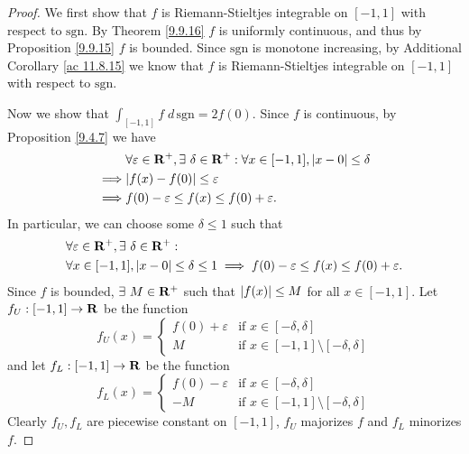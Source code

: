 \begin{proof}
    We first show that \(f\) is Riemann-Stieltjes integrable on \([-1, 1]\) with respect to \(\text{sgn}\).
    By Theorem \ref{9.9.16} \(f\) is uniformly continuous, and thus by Proposition \ref{9.9.15} \(f\) is bounded.
    Since \(\text{sgn}\) is monotone increasing, by Additional Corollary \ref{ac 11.8.15} we know that \(f\) is Riemann-Stieltjes integrable on \([-1, 1]\) with respect to \(\text{sgn}\).

    Now we show that \(\int_{[-1, 1]} f \; d \, \text{sgn} = 2f(0)\).
    Since \(f\) is continuous, by Proposition \ref{9.4.7} we have
    \begin{align*}
                 & \forall \varepsilon \in \R^+, \exists\ \delta \in \R^+ : \forall x \in [-1, 1], \abs{x - 0} \leq \delta \\
        \implies & \abs{f(x) - f(0)} \leq \varepsilon                                                                      \\
        \implies & f(0) - \varepsilon \leq f(x) \leq f(0) + \varepsilon.
    \end{align*}
    In particular, we can choose some \(\delta \leq 1\) such that
    \begin{align*}
         & \forall \varepsilon \in \mathbf{R}^+, \exists\ \delta \in \mathbf{R}^+ :                                                             \\
         & \forall x \in [-1, 1], \left\lvert x - 0\right\rvert \leq \delta \leq 1 \implies f(0) - \varepsilon \leq f(x) \leq f(0) + \varepsilon.
    \end{align*}
    Since \(f\) is bounded, \(\exists\ M \in \mathbf{R}^+\) such that \(\left\lvert f(x)\right\rvert \leq M\) for all \(x \in [-1, 1]\).
    Let \(f_U : [-1, 1] \to \mathbf{R}\) be the function
    \[
        f_U(x) = \begin{cases}
            f(0) + \varepsilon & \text{if } x \in [-\delta, \delta]                   \\
            M                  & \text{if } x \in [-1, 1] \setminus [-\delta, \delta]
        \end{cases}
    \]
    and let \(f_L : [-1, 1] \to \mathbf{R}\) be the function
    \[
        f_L(x) = \begin{cases}
            f(0) - \varepsilon & \text{if } x \in [-\delta, \delta]                   \\
            -M                 & \text{if } x \in [-1, 1] \setminus [-\delta, \delta]
        \end{cases}
    \]
    Clearly \(f_U, f_L\) are piecewise constant on \([-1, 1]\), \(f_U\) majorizes \(f\) and \(f_L\) minorizes \(f\).

\end{proof}
